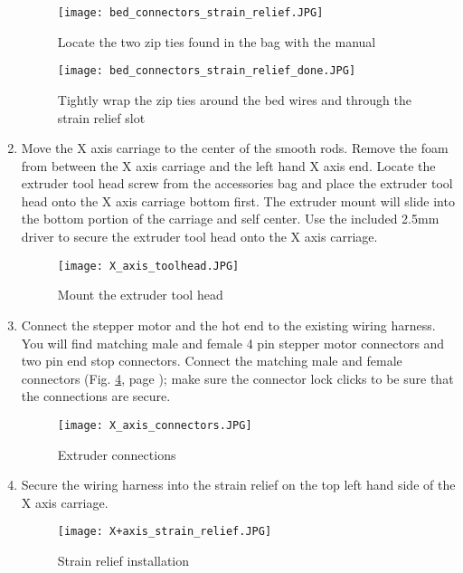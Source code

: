 \begin{enumerate}
\begin{figure}[H]
\centering
\texttt{[image: bed\_connectors\_strain\_relief.JPG]}
\caption{Locate the two zip ties found in the bag with the manual}
\label{fig:bed_connectors_strain_relief}
\end{figure}

\begin{figure}[H]
\centering
\texttt{[image: bed\_connectors\_strain\_relief\_done.JPG]}
\caption{Tightly wrap the zip ties around the bed wires and through the strain relief slot}
\label{fig:bed_connectors_strain_relief_done}
\end{figure}

\item Move the X axis carriage to the center of the smooth rods. Remove the foam from between the X axis carriage and the left hand X axis end. Locate the extruder tool head screw from the accessories bag and place the extruder tool head onto the X axis carriage bottom first. The extruder mount will slide into the bottom portion of the carriage and self center. Use the included 2.5mm driver to secure the extruder tool head onto the X axis carriage.
\begin{figure}[hp]
\centering
\texttt{[image: X\_axis\_toolhead.JPG]}
\caption{Mount the extruder tool head}
\label{fig:X_axis_toolhead}
\end{figure}

\item Connect the stepper motor and the hot end to the existing wiring harness.  You will find matching male and female 4 pin stepper motor connectors and two pin end stop connectors. Connect the matching male and female connectors (Fig. \ref{fig:X_axis_connectors}, page \pageref{fig:X_axis_connectors}); make sure the connector lock clicks to be sure that the connections are secure.
\begin{figure}[hp]
\centering
\texttt{[image: X\_axis\_connectors.JPG]}
\caption{Extruder connections}
\label{fig:X_axis_connectors}
\end{figure}

\item Secure the wiring harness into the strain relief on the top left hand side of the X axis carriage. 
\begin{figure}[hp]
\centering
\texttt{[image: X+axis\_strain\_relief.JPG]}
\caption{Strain relief installation}
\label{fig:X_axis_strain_relief}
\end{figure}


\end{enumerate}
